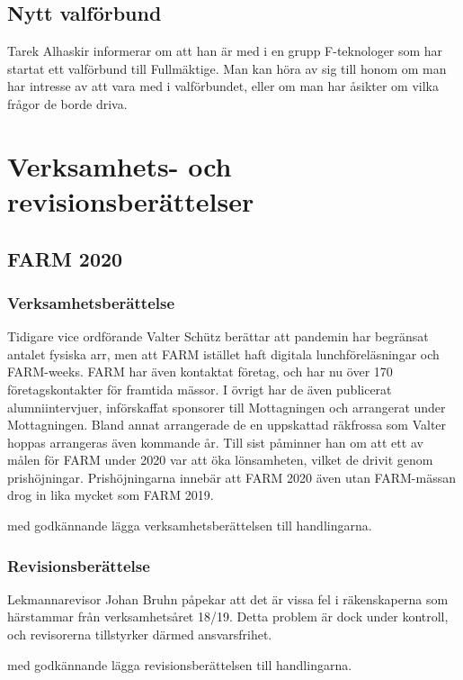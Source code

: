 \documentclass[hidelinks]{sektionsmote}
\begin{document}
\subsection{Nytt valförbund}
Tarek Alhaskir informerar om att han är med i en grupp F-teknologer som har startat ett valförbund till Fullmäktige.
Man kan höra av sig till honom om man har intresse av att vara med i valförbundet, eller om man har åsikter om vilka frågor de borde driva.


\section{Verksamhets- och revisionsberättelser}
\subsection{FARM 2020}
\subsubsection{Verksamhetsberättelse}
Tidigare vice ordförande Valter Schütz berättar att pandemin har begränsat antalet fysiska arr, men att FARM istället haft digitala lunchföreläsningar och FARM-weeks.
FARM har även kontaktat företag, och har nu över 170 företagskontakter för framtida mässor.
I övrigt har de även publicerat alumniintervjuer, införskaffat sponsorer till Mottagningen och arrangerat under Mottagningen.
Bland annat arrangerade de en uppskattad räkfrossa som Valter hoppas arrangeras även kommande år.
Till sist påminner han om att ett av målen för FARM under 2020 var att öka lönsamheten, vilket de drivit genom prishöjningar.
Prishöjningarna innebär att FARM 2020 även utan FARM-mässan drog in lika mycket som FARM 2019.

\begin{beslut}
  \item med godkännande lägga verksamhetsberättelsen till handlingarna.
\end{beslut}


\subsubsection{Revisionsberättelse}
Lekmannarevisor Johan Bruhn påpekar att det är vissa fel i räkenskaperna som härstammar från verksamhetsåret 18/19.
Detta problem är dock under kontroll, och revisorerna tillstyrker därmed ansvarsfrihet.

\begin{beslut}
  \item med godkännande lägga revisionsberättelsen till handlingarna.%
\end{beslut}
\end{document}
